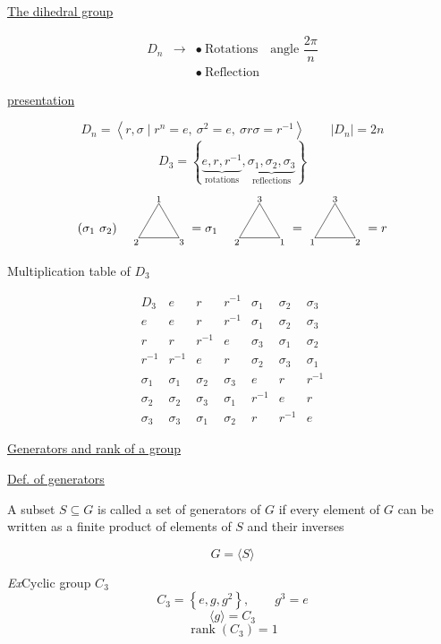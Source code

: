 \documentclass[a4paper,11pt]{article}
\newcommand{\sig}[1]{\sigma_{#1}}
\newcommand{\tri}[3]{%
  \begin{tikzpicture}[baseline=-0.45em,scale=0.54]
    \draw (0,1.2)--(-1.05,-0.6)--(1.05,-0.6)--cycle;
    \node at (0,1.42) {\scriptsize $#1$};
    \node at (-1.18,-0.82) {\scriptsize $#2$};
    \node at (1.18,-0.82) {\scriptsize $#3$};
  \end{tikzpicture}%
}
\begin{document}
\vspace{0.7em}
\begin{center}
{\Large \underline{The dihedral group}}
\end{center}
\[
\begin{array}{rcl}
D_n&\longrightarrow&\bullet\ \text{Rotations}\quad\text{angle }\dfrac{2\pi}{n}\\
&&\bullet\ \text{Reflection}
\end{array}
\]

\begin{center}
\underline{presentation}
\end{center}
\[
D_n=\left\langle r,\sigma\mid r^n=e,\ \sigma^2=e,\ \sigma r\sigma=r^{-1}\right\rangle
\qquad |D_n|=2n
\]
\[
D_3=\left\{\underbrace{e,r,r^{-1}}_{\text{rotations}},\underbrace{\sig{1},\sig{2},\sig{3}}_{\text{reflections}}\right\}
\]
\[
(\sig{1}\ \sig{2})\quad
\tri{1}{2}{3}
=\sig{1}\quad
\tri{3}{2}{1}
=\tri{3}{1}{2}=r
\]

\begin{center}
{\Large Multiplication table of $D_3$}
\end{center}
\[
\begin{array}{c|c|c|c|c|c|c}
D_3&e&r&r^{-1}&\sig{1}&\sig{2}&\sig{3}\\ \hline
e&e&r&r^{-1}&\sig{1}&\sig{2}&\sig{3}\\ \hline
r&r&r^{-1}&e&\sig{3}&\sig{1}&\sig{2}\\ \hline
r^{-1}&r^{-1}&e&r&\sig{2}&\sig{3}&\sig{1}\\ \hline
\sig{1}&\sig{1}&\sig{2}&\sig{3}&e&r&r^{-1}\\ \hline
\sig{2}&\sig{2}&\sig{3}&\sig{1}&r^{-1}&e&r\\ \hline
\sig{3}&\sig{3}&\sig{1}&\sig{2}&r&r^{-1}&e
\end{array}
\]

\vspace{0.5em}
\begin{center}
{\Large \underline{Generators and rank of a group}}
\end{center}

\underline{Def. of generators}

A subset $S\subseteq G$ is called a set of generators of $G$
if every element of $G$ can be written as a finite product of
elements of $S$ and their inverses

\[
\boxed{G=\langle S\rangle}
\]

\textit{Ex}\quad Cyclic group $C_3$
\[
C_3=\left\{e,g,g^2\right\},\qquad g^3=e
\]
\[
\langle g\rangle=C_3
\]
\[
\operatorname{rank}(C_3)=1
\]
\end{document}
